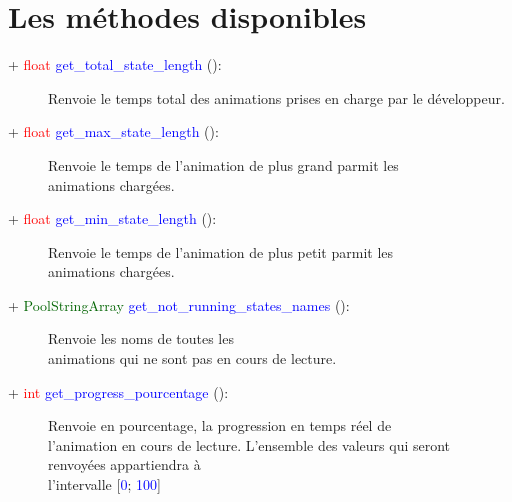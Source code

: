 \documentclass[a4paper, 11pt]{article}
\begin{document}
	\section{Les méthodes disponibles}
	\begin{description}
		\item [+ \textcolor{red}{float} \textcolor{blue}{get\_total\_state\_length} ():] Renvoie le temps 
		total des animations prises en charge par le développeur.\\
	\end{description}
	\begin{description}
		\item [+ \textcolor{red}{float} \textcolor{blue}{get\_max\_state\_length} ():] Renvoie le temps de 
		l'animation de plus grand parmit les \\animations chargées.\\
	\end{description}
	\begin{description}
		\item [+ \textcolor{red}{float} \textcolor{blue}{get\_min\_state\_length} ():] Renvoie le temps de 
		l'animation de plus petit parmit les \\animations chargées.\\
	\end{description}
	\begin{description}
		\item [+ \textcolor{darkgreen}{PoolStringArray} \textcolor{blue}{get\_not\_running\_states\_names} 
		():] Renvoie les noms de toutes les \\animations qui ne sont pas en cours de lecture.\\
	\end{description}
	\begin{description}
		\item [+ \textcolor{red}{int} \textcolor{blue}{get\_progress\_pourcentage} ():] Renvoie en 
		pourcentage, la progression en temps réel de \\l'animation en cours de lecture. L'ensemble des 
		valeurs qui seront renvoyées appartiendra à \\l'intervalle [\textcolor{blue}{0}; \textcolor{blue}
		{100}]\\
	\end{description}
\end{document}
